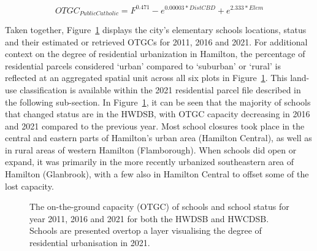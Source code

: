 \documentclass[
default
]{sn-jnl}
\begin{document}
\begin{equation}
\label{eq:OTGC-catholic}
OTGC_{Public Catholic} =F^{0.471}-e^{0.00003*DistCBD}+e^{2.333*Elem}
\end{equation}



Taken together, Figure~\ref{fig-Fig2} displays the city's elementary
schools locations, status and their estimated or retrieved OTGCs for
2011, 2016 and 2021. For additional context on the degree of residential
urbanization in Hamilton, the percentage of residential parcels
considered `urban' compared to `suburban' or `rural' is reflected at an
aggregated spatial unit across all six plots in Figure~\ref{fig-Fig2}.
This land-use classification is available within the 2021 residential
parcel file described in the following sub-section. In
Figure~\ref{fig-Fig2}, it can be seen that the majority of schools that
changed status are in the HWDSB, with OTGC capacity decreasing in 2016
and 2021 compared to the previous year. Most school closures took place
in the central and eastern parts of Hamilton's urban area (Hamilton
Central), as well as in rural areas of western Hamilton (Flamborough).
When schools did open or expand, it was primarily in the more recently
urbanized southeastern area of Hamilton (Glanbrook), with a few also in
Hamilton Central to offset some of the lost capacity.

\begin{figure}


\caption{\label{fig-Fig2}The on-the-ground capacity (OTGC) of schools
and school status for year 2011, 2016 and 2021 for both the HWDSB and
HWCDSB. Schools are presented overtop a layer visualising the degree of
residential urbanisation in 2021.}

\end{figure}%
\end{document}
